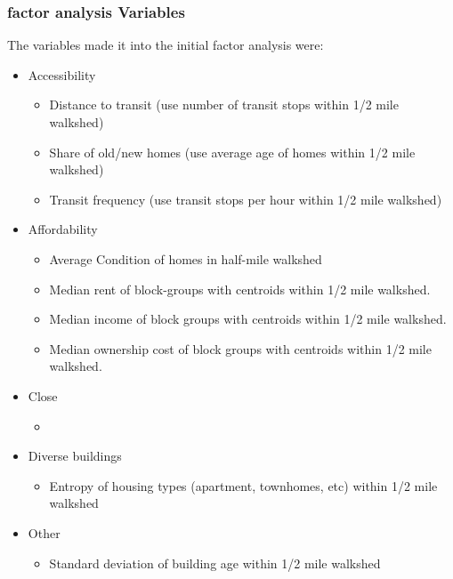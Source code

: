 \documentclass[
]{book}
\providecommand{\tightlist}{%
  \setlength{\itemsep}{0pt}\setlength{\parskip}{0pt}}
\begin{document}
\hypertarget{factor-analysis-variables}{%
\subsubsection{factor analysis Variables}\label{factor-analysis-variables}}

The variables made it into the initial factor analysis were:

\begin{itemize}
\item
  Accessibility

  \begin{itemize}
  \tightlist
  \item
    Distance to transit (use number of transit stops within 1/2 mile walkshed)
  \item
    Share of old/new homes (use average age of homes within 1/2 mile walkshed)
  \item
    Transit frequency (use transit stops per hour within 1/2 mile walkshed)
  \end{itemize}
\item
  Affordability

  \begin{itemize}
  \tightlist
  \item
    Average Condition of homes in half-mile walkshed
  \item
    Median rent of block-groups with centroids within 1/2 mile walkshed.
  \item
    Median income of block groups with centroids within 1/2 mile walkshed.
  \item
    Median ownership cost of block groups with centroids within 1/2 mile walkshed.
  \end{itemize}
\item
  Close

  \begin{itemize}
  \tightlist
  \item
  \end{itemize}
\item
  Diverse buildings

  \begin{itemize}
  \tightlist
  \item
    Entropy of housing types (apartment, townhomes, etc) within 1/2 mile walkshed
  \end{itemize}
\item
  Other

  \begin{itemize}
  \tightlist
  \item
    Standard deviation of building age within 1/2 mile walkshed
  \end{itemize}
\end{itemize}
\end{document}
